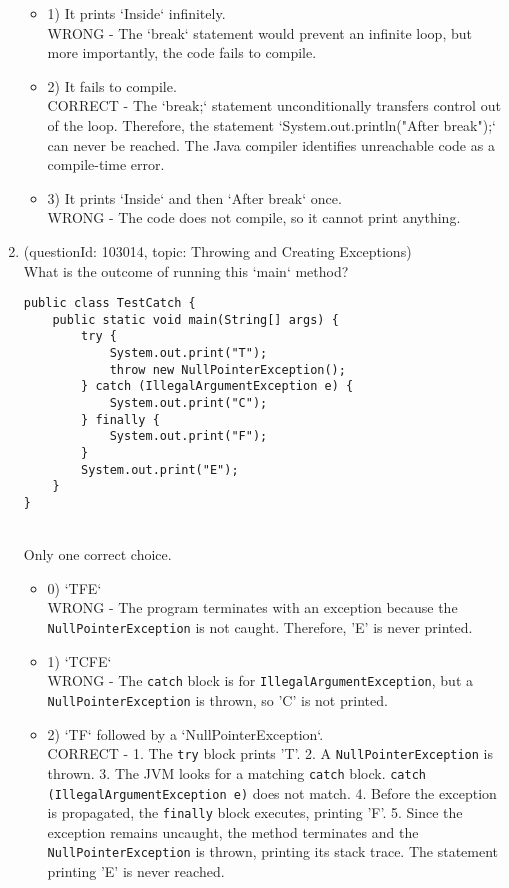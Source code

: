 \documentclass[12pt]{article}
\begin{document}
\begin{enumerate}[label=(\arabic*)]
\begin{itemize}
\item 1) It prints `Inside` infinitely.
 \\ 
WRONG - The `break` statement would prevent an infinite loop, but more importantly, the code fails to compile.

\item 2) It fails to compile.
 \\ 
CORRECT - The `break;` statement unconditionally transfers control out of the loop. Therefore, the statement `System.out.println("After break");` can never be reached. The Java compiler identifies unreachable code as a compile-time error.

\item 3) It prints `Inside` and then `After break` once.
 \\ 
WRONG - The code does not compile, so it cannot print anything.

\end{itemize}
\item (questionId: 103014, topic: Throwing and Creating Exceptions) \\ 
What is the outcome of running this `main` method?
\begin{verbatim}
public class TestCatch {
    public static void main(String[] args) {
        try {
            System.out.print("T");
            throw new NullPointerException();
        } catch (IllegalArgumentException e) {
            System.out.print("C");
        } finally {
            System.out.print("F");
        }
        System.out.print("E");
    }
}
\end{verbatim}
\\ \noindent Only one correct choice. 
\begin{itemize}
\item 0) `TFE`
 \\ 
WRONG - The program terminates with an exception because the \verb|NullPointerException| is not caught. Therefore, 'E' is never printed.

\item 1) `TCFE`
 \\ 
WRONG - The \verb|catch| block is for \verb|IllegalArgumentException|, but a \verb|NullPointerException| is thrown, so 'C' is not printed.

\item 2) `TF` followed by a `NullPointerException`.
 \\ 
CORRECT - 1. The \verb|try| block prints 'T'. 2. A \verb|NullPointerException| is thrown. 3. The JVM looks for a matching \verb|catch| block. \verb|catch (IllegalArgumentException e)| does not match. 4. Before the exception is propagated, the \verb|finally| block executes, printing 'F'. 5. Since the exception remains uncaught, the method terminates and the \verb|NullPointerException| is thrown, printing its stack trace. The statement printing 'E' is never reached.


\end{itemize}
\end{enumerate}
\end{document}
